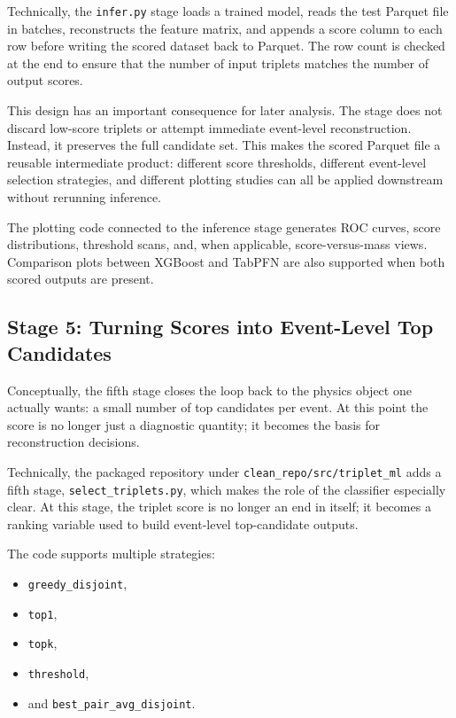 \documentclass[11pt]{article}
\begin{document}
Technically, the \texttt{infer.py} stage loads a trained model, reads the test Parquet file in batches, reconstructs the feature matrix, and appends a score column to each row before writing the scored dataset back to Parquet. The row count is checked at the end to ensure that the number of input triplets matches the number of output scores.

This design has an important consequence for later analysis. The stage does not discard low-score triplets or attempt immediate event-level reconstruction. Instead, it preserves the full candidate set. This makes the scored Parquet file a reusable intermediate product: different score thresholds, different event-level selection strategies, and different plotting studies can all be applied downstream without rerunning inference.

The plotting code connected to the inference stage generates ROC curves, score distributions, threshold scans, and, when applicable, score-versus-mass views. Comparison plots between XGBoost and TabPFN are also supported when both scored outputs are present.

\subsection{Stage 5: Turning Scores into Event-Level Top Candidates}

Conceptually, the fifth stage closes the loop back to the physics object one actually wants: a small number of top candidates per event. At this point the score is no longer just a diagnostic quantity; it becomes the basis for reconstruction decisions.

Technically, the packaged repository under \texttt{clean\_repo/src/triplet\_ml} adds a fifth stage, \texttt{select\_triplets.py}, which makes the role of the classifier especially clear. At this stage, the triplet score is no longer an end in itself; it becomes a ranking variable used to build event-level top-candidate outputs.

The code supports multiple strategies:
\begin{itemize}[leftmargin=*]
  \item \texttt{greedy\_disjoint},
  \item \texttt{top1},
  \item \texttt{topk},
  \item \texttt{threshold},
  \item and \texttt{best\_pair\_avg\_disjoint}.
\end{itemize}
\end{document}
